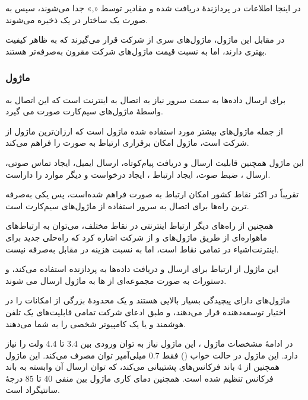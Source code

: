 در اینجا اطلاعات در پردازندهٔ  دریافت شده و مقادیر توسط «,» جدا می‌شوند، سپس به صورت یک ساختار در یک  ذخیره می‌شوند.

در مقابل این ماژول، ماژول‌های سری  از شرکت  قرار می‌گیرند که به ظاهر کیفیت بهتری دارند، اما به نسبت قیمت ماژول‌های شرکت  مقرون به‌صرفه‌تر هستند.
\cite{GPVTG21:online}

\subsubsection{ماژول }\label{subsubsec2:subsec1:sec2:chap5}

برای ارسال داده‌ها به سمت سرور نیاز به اتصال به اینترنت است که این اتصال به واسطهٔ ماژول‌های سیم‌کارت صورت می گیرد.

از جمله ماژول‌های بیشتر مورد استفاده شده ماژول  است که ارزان‌ترین ماژول  از شرکت  است، ماژول  امکان برقراری ارتباط به صورت  را فراهم می‌کند.

این ماژول همچنین قابلیت ارسال و دریافت پیام‌کوتاه، ارسال ایمیل، ایجاد تماس صوتی، ارسال ، ضبط صوت، ایجاد ارتباط ، ایجاد درخواست  و دیگر موارد را داراست.

تقریباً در اکثر نقاط کشور امکان ارتباط به صورت  فراهم شده‌است، پس یکی به‌صرفه ترین راه‌ها برای اتصال به سرور استفاده از ماژول‌های سیم‌کارت است.

همچنین از راه‌های دیگر ارتباط اینترنتی در نقاط مختلف، می‌‌توان به ارتباط‌های ماهواره‌ای از طریق ماژول‌های  و  از شرکت  اشاره کرد که راه‌حلی جدید برای اینترنت‌اشیاء در تمامی نقاط است، اما به نسبت هزینه در مقابل  به‌صرفه نیست.

این ماژول از ارتباط  برای ارسال و دریافت داده‌ها به پردازنده استفاده می‌کند، و دستورات به صورت مجموعه‌ای از ها به ماژول ارسال می شوند.

ماژول‌های  دارای پیچیدگی بسیار بالایی هستند و یک محدودهٔ‌ بزرگی از امکانات را در اختیار توسعه‌دهنده قرار می‌دهند، و طبق ادعای شرکت  تمامی قابلیت‌های یک تلفن هوشمند و یا یک کامپیوتر شخصی را به شما می‌دهند.

در ادامهٔ مشخصات ماژول ، این ماژول نیاز به توان ورودی بین $3.4$ تا $4.4$ ولت را نیاز دارد. این ماژول در حالت خواب () فقط $0.7$
میلی‌آمپر توان مصرف می‌کند. این ماژول همچنین از $4$ باند فرکانس‌های  پشتیبانی می‌کند، که توان ارسال آن وابسته به باند فرکانس تنظیم شده است.
همچنین دمای کاری ماژول بین منفی $40$ تا $85$ درجهٔ سانتیگراد است.

